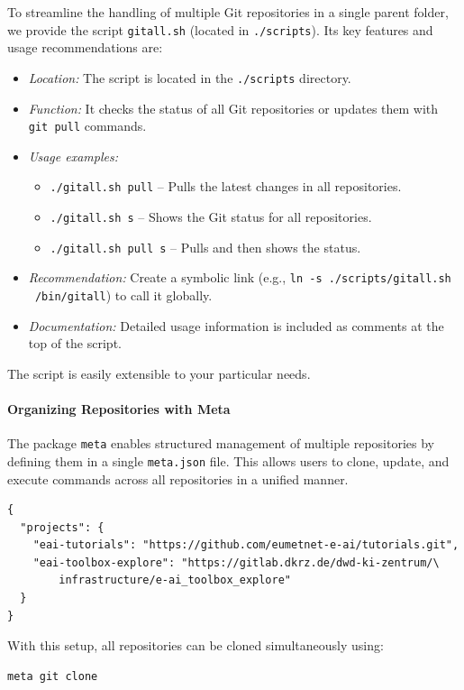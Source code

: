 To streamline the handling of multiple Git repositories in a single parent folder, we provide the script \texttt{gitall.sh} (located in \texttt{\scriptsize ./scripts}). Its key features and usage recommendations are:

\begin{itemize}
  \item \emph{Location:} The script is located in the \texttt{./scripts} directory.
  \item \emph{Function:} It checks the status of all Git repositories or updates them with \texttt{git pull} commands.
  \item \emph{Usage examples:}
  \begin{itemize}
    \item \texttt{./gitall.sh pull} – Pulls the latest changes in all repositories.
    \item \texttt{./gitall.sh s} – Shows the Git status for all repositories.
    \item \texttt{./gitall.sh pull s} – Pulls and then shows the status.
  \end{itemize}
  \item \emph{Recommendation:} Create a symbolic link (e.g., \texttt{ln -s ./scripts/gitall.sh ~/bin/gitall}) to call it globally.
  \item \emph{Documentation:} Detailed usage information is included as comments at the top of the script.
\end{itemize}
The script is easily extensible to your particular needs. 

\paragraph{Organizing Repositories with Meta} 
The package \texttt{meta} enables structured management of multiple repositories by defining them in a single \texttt{meta.json} file. This allows users to clone, update, and execute commands across all repositories in a unified manner.

\begin{verbatim}
{
  "projects": {
    "eai-tutorials": "https://github.com/eumetnet-e-ai/tutorials.git",
    "eai-toolbox-explore": "https://gitlab.dkrz.de/dwd-ki-zentrum/\
		infrastructure/e-ai_toolbox_explore"
  }
}
\end{verbatim}

With this setup, all repositories can be cloned simultaneously using:
\begin{verbatim}
meta git clone
\end{verbatim}

